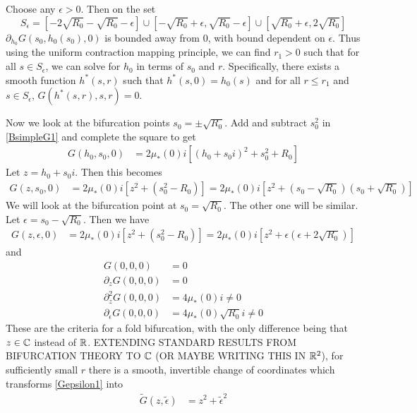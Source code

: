 \documentclass[thesis.tex]{subfiles}
\begin{document}
Choose any $\epsilon > 0$. Then on the set
\[
S_\epsilon = [-2 \sqrt{R_0} -\sqrt{R_0} - \epsilon]
\cup [-\sqrt{R_0} + \epsilon, \sqrt{R_0} - \epsilon]
\cup [\sqrt{R_0} + \epsilon, 2\sqrt{R_0}]
\]
$\partial_{h_0} G(s_0, h_0(s_0), 0)$ is bounded away from 0, with bound dependent on $\epsilon$. Thus using the uniform contraction mapping principle, we can find $r_1 > 0$ such that for all $s \in S_\epsilon$, we can solve for $h_0$ in terms of $s_0$ and $r$. Specifically, there exists a smooth function $h^*(s, r)$ such that $h^*(s, 0) = h_0(s)$ and for all $r \leq r_1$ and $s \in S_\epsilon$, $G(h^*(s,r),s,r) = 0$.

Now we look at the bifurcation points $s_0 = \pm \sqrt{R_0}$. Add and subtract $s_0^2$ in \cref{BsimpleG1} and complete the square to get
\begin{equation*}
\begin{aligned}
G(h_0, s_0, 0) &= 2 \mu_*(0) i\left[ (h_0 + s_0 i)^2 + s_0^2 + R_0 \right] 
\end{aligned}
\end{equation*}
Let $z = h_0 + s_0 i$. Then this becomes
\begin{equation*}
\begin{aligned}
G(z, s_0, 0) &= 2 \mu_*(0) i\left[z^2 + (s_0^2 - R_0) \right] = 2 \mu_*(0) i\left[z^2 + (s_0 - \sqrt{R_0})(s_0 + \sqrt{R_0}) \right]
\end{aligned}
\end{equation*}
We will look at the bifurcation point at $s_0 = \sqrt{R_0}$. The other one will be similar. Let $\epsilon = s_0 - \sqrt{R_0}$. Then we have
\begin{equation}\label{Gepsilon1}
\begin{aligned}
G(z, \epsilon, 0) &= 2 \mu_*(0) i\left[z^2 + (s_0^2 - R_0) \right] = 2 \mu_*(0) i\left[z^2 + \epsilon(\epsilon + 2 \sqrt{R_0}) \right]
\end{aligned}
\end{equation}
and
\begin{align*}
G(0, 0, 0) &= 0 \\
\partial_z G(0,0,0) &= 0 \\
\partial_z^2 G(0,0,0) &= 4 \mu_*(0) i \neq 0 \\
\partial_\epsilon G(0, 0, 0) &= 4 \mu_*(0) \sqrt{R_0} i \neq 0
\end{align*}
These are the criteria for a fold bifurcation, with the only difference being that $z \in \mathbb{C}$ instead of $\mathbb{R}$. EXTENDING STANDARD RESULTS FROM BIFURCATION THEORY TO $\mathbb{C}$ (OR MAYBE WRITING THIS IN $\mathbb{R}^2$), for sufficiently small $r$ there is a smooth, invertible change of coordinates which transforms \cref{Gepsilon1} into
\begin{equation}\label{Gepsilon2}
\begin{aligned}
\tilde{G}(z, \tilde{\epsilon}) &= z^2 + \tilde{\epsilon}^2
\end{aligned}
\end{equation}

\iffulldocument\else
	
	
\fi
\end{document}
